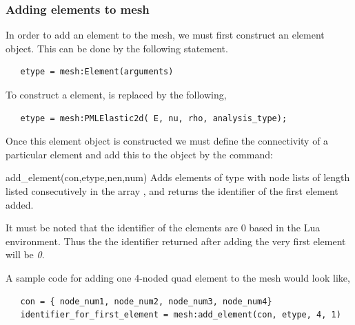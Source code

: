 \subsubsection{Adding elements to mesh}
In order to add an element to the mesh, we must first 
construct an element object. This can be done by the
following statement.
\begin{verbatim}
   etype = mesh:Element(arguments)
\end{verbatim}
To construct a  element, 
is replaced by the following,
\begin{verbatim}
   etype = mesh:PMLElastic2d( E, nu, rho, analysis_type);
\end{verbatim}
Once this element object is constructed we must define the
connectivity of a particular element and add this to the
 object by the command:
\begin{codelist}

  \item[add\_element(con,etype,nen,num)]
    Adds  elements of type  with node lists of
    length  listed consecutively in the array ,
    and returns the identifier of the first element added.

\end{codelist}
It must be noted that the identifier of the elements are 0 based in the
Lua environment. Thus the the identifier returned after adding the
very first element will be \emph{0}.

A sample code for adding one 4-noded quad element to the mesh 
would look like,
\begin{verbatim}
   con = { node_num1, node_num2, node_num3, node_num4}
   identifier_for_first_element = mesh:add_element(con, etype, 4, 1)
\end{verbatim}

